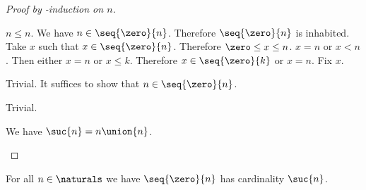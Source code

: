 \begin{proof} [Proof by \in-induction on $n$]
\begin{byCase}
\begin{subproof}
\begin{subproof}
                    $n \leq n$.
                    We have $n \in \seq{\zero}{n}$.
                    Therefore $\seq{\zero}{n}$ is inhabited.
                    Take $x$ such that $x \in \seq{\zero}{n}$.
                    Therefore $\zero \leq x \leq n$.
                    $x = n$ or $x < n$.
                    Then either $x = n$ or $x \leq k$.
                    Therefore $x \in \seq{\zero}{k}$ or $x = n$.
                    Fix $x$.
                    \begin{byCase}
                            Trivial.
                            It suffices to show that $n \in \seq{\zero}{n}$.
                    \end{byCase}
                \end{subproof}
                Trivial.
            \end{subproof}
            We have $\suc{n} = n \union \{n\}$.
    \end{byCase}

    
    
\end{proof}

\begin{proposition}\label{seq_zero_to_n_isomorph_to_suc_n}
    For all $n \in \naturals$ we have $\seq{\zero}{n}$ has cardinality $\suc{n}$.
\end{proposition}

